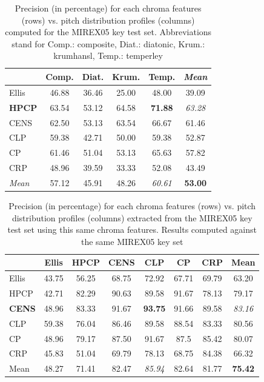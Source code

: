 \documentclass{article}
\begin{document}


\begin{table}
 \begin{center}
 \renewcommand{\arraystretch}{1.3}
 \begin{tabular}{|l|c|c|c|c!{\vrule width 1pt}c|}
	\hline
				&	Comp.	&	Diat.	&	Krum.	&	\bf{Temp.}	& 	\it{Mean}	\\
	\hline
  	Ellis		&	46.88	&	36.46	&	25.00	&	48.00		&	39.09		\\
  	\bf{HPCP}	&	63.54	&	53.12	&	64.58	&	\bf{71.88}	&	\it{63.28}	\\
  	CENS			&	62.50	&	53.13	&	63.54	&	66.67		&	61.46		\\
  	CLP			&	59.38	&	42.71	&	50.00	&	59.38		&	52.87		\\
  	CP			&	61.46	&	51.04	&	53.13	&	65.63		&	57.82		\\
  	CRP			&	48.96	&	39.59	&	33.33	&	52.08		&	43.49		\\
  	\it{Mean}	&	57.12	&	45.91	&	48.26	&	\it{60.61}	&	\bf{53.00}	\\  	
 	\hline
 \end{tabular}
\end{center}
 \caption{Precision (in percentage) for each chroma features (rows) vs. pitch distribution profiles (columns) computed for the MIREX05 key test set. Abbreviations stand for Comp.: composite, Diat.: diatonic, Krum.: krumhansl, Temp.: temperley}
 \label{tab:precision}
\end{table}

\begin{table}
 \begin{center}
 \begin{tabular}{|l|c|c|c|c|c|c!{\vrule width 1pt}c|}
   \hline
				&	Ellis	&	HPCP		&	CENS		&	\bf{CLP} 	&	CP		&	CRP		&	Mean			\\
  \hline
  	Ellis		&	43.75	&	56.25	&	68.75	&	72.92		&	67.71	&	69.79	&	63.20		\\
  	HPCP			&	42.71	&	82.29	&	90.63	&	89.58		&	91.67	&	78.13	&	79.17		\\
  	\bf{CENS}	&	48.96	&	83.33	&	91.67	&	\bf{93.75}	&	91.66	&	89.58	&	\it{83.16}	\\
  	CLP			&	59.38	&	76.04	&	86.46	&	89.58		&	88.54	&	83.33	&	80.56		\\
  	CP			&	48.96	&	79.17	&	87.50	&	91.67		&	87.5		&	85.42	&	80.07		\\
  	CRP			&	45.83	&	51.04	&	69.79	&	78.13		&	68.75	&	84.38	&	66.32		\\
  	Mean			&	48.27	&	71.41	&	82.47	&	\it{85.94}	&	82.64	&	81.77	&	\bf{75.42}	\\
  \hline
 \end{tabular}
\end{center}
 \caption{Precision (in percentage) for each chroma features (rows) vs. pitch distribution profiles (columns) extracted from the MIREX05 key test set using this same chroma features. Results computed against the same MIREX05 key set}
 \label{tab:precision_extracted}
\end{table}
\end{document}
